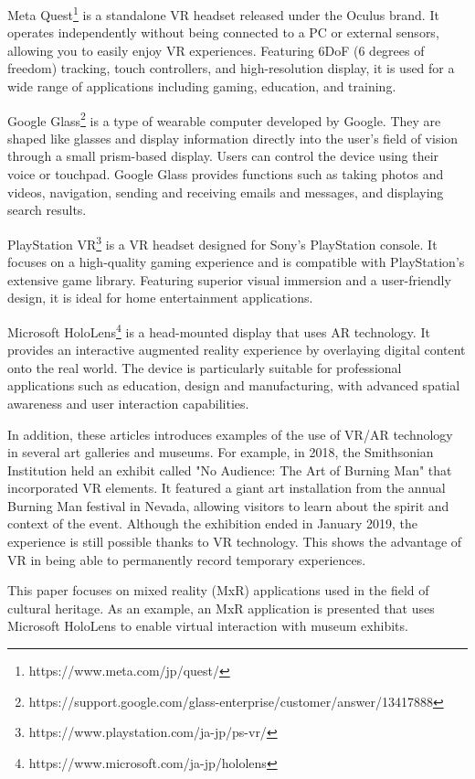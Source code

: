 \documentclass[12pt]{article}
\begin{document}
Meta Quest\footnote{https://www.meta.com/jp/quest/} is a standalone VR headset
released under the Oculus brand. It
operates independently without being connected to a PC or external sensors,
allowing you to easily enjoy VR experiences. Featuring 6DoF (6 degrees of
freedom) tracking, touch controllers, and high-resolution display, it is used
for a wide range of applications including gaming, education, and training.

Google
Glass\footnote{https://support.google.com/glass-enterprise/customer/answer/13417888}
is a type of wearable computer developed by Google. They are
shaped like glasses and display information directly into the user's field of
vision through a small prism-based display. Users can control the device using
their voice or touchpad. Google Glass provides functions such as taking photos
and videos, navigation, sending and receiving emails and messages, and
displaying search results.

PlayStation VR\footnote{https://www.playstation.com/ja-jp/ps-vr/} is a VR
headset designed for Sony's PlayStation console. It
focuses on a high-quality gaming experience and is compatible with
PlayStation's extensive game library. Featuring superior visual immersion and a
user-friendly design, it is ideal for home entertainment applications.

Microsoft HoloLens\footnote{https://www.microsoft.com/ja-jp/hololens} is a
head-mounted display that uses AR technology. It
provides an interactive augmented reality experience by overlaying digital
content onto the real world. The device is particularly suitable for
professional applications such as education, design and manufacturing, with
advanced spatial awareness and user interaction capabilities.

In addition, these articles\cite{vr_museum, vr_museum_ieee} introduces examples
of the use of VR/AR technology in several art galleries and museums. For
example, in 2018,
the Smithsonian Institution held an exhibit called "No Audience: The Art of
Burning Man" that incorporated VR elements. It featured a giant art
installation from the annual Burning Man festival in Nevada, allowing visitors
to learn about the spirit and context of the event. Although the exhibition
ended in January 2019, the experience is still possible thanks to VR
technology. This shows the advantage of VR in being able to permanently record
temporary experiences.

This paper \cite{10.3389/frobt.2019.00091} focuses on mixed reality (MxR)
applications used in the
field of cultural
heritage. As an example, an MxR application is presented that uses Microsoft
HoloLens to enable virtual interaction with museum exhibits.
\end{document}
